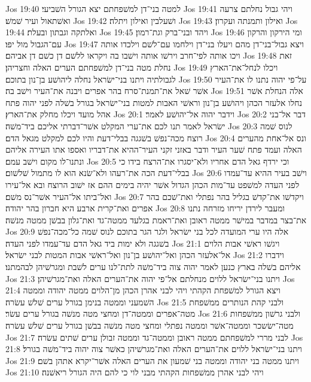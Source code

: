 Jos 19:40  למטה בני־דן למשׁפחתם יצא הגורל השׁביעי׃
Jos 19:41  ויהי גבול נחלתם צרעה ואשׁתאול ועיר שׁמשׁ׃
Jos 19:42  ושׁעלבין ואילון ויתלה׃
Jos 19:43  ואילון ותמנתה ועקרון׃
Jos 19:44  ואלתקה וגבתון ובעלת׃
Jos 19:45  ויהד ובני־ברק וגת־רמון׃
Jos 19:46  ומי הירקון והרקון עם־הגבול מול יפו׃
Jos 19:47  ויצא גבול־בני־דן מהם ויעלו בני־דן וילחמו עם־לשׁם וילכדו אותה ויכו אותה לפי־חרב וירשׁו אותה וישׁבו בה ויקראו ללשׁם דן כשׁם דן אביהם׃
Jos 19:48  זאת נחלת מטה בני־דן למשׁפחתם הערים האלה וחצריהן׃
Jos 19:49  ויכלו לנחל־את־הארץ לגבולתיה ויתנו בני־ישׂראל נחלה ליהושׁע בן־נון בתוכם׃
Jos 19:50  על־פי יהוה נתנו לו את־העיר אשׁר שׁאל את־תמנת־סרח בהר אפרים ויבנה את־העיר וישׁב בה׃
Jos 19:51  אלה הנחלת אשׁר נחלו אלעזר הכהן ויהושׁע בן־נון וראשׁי האבות למטות בני־ישׂראל בגורל בשׁלה לפני יהוה פתח אהל מועד ויכלו מחלק את־הארץ׃
Jos 20:1  וידבר יהוה אל־יהושׁע לאמר׃
Jos 20:2  דבר אל־בני ישׂראל לאמר תנו לכם את־ערי המקלט אשׁר־דברתי אליכם ביד־משׁה׃
Jos 20:3  לנוס שׁמה רוצח מכה־נפשׁ בשׁגגה בבלי־דעת והיו לכם למקלט מגאל הדם׃
Jos 20:4  ונס אל־אחת מהערים האלה ועמד פתח שׁער העיר ודבר באזני זקני העיר־ההיא את־דבריו ואספו אתו העירה אליהם ונתנו־לו מקום וישׁב עמם׃
Jos 20:5  וכי ירדף גאל הדם אחריו ולא־יסגרו את־הרצח בידו כי בבלי־דעת הכה את־רעהו ולא־שׂנא הוא לו מתמול שׁלשׁום׃
Jos 20:6  וישׁב בעיר ההיא עד־עמדו לפני העדה למשׁפט עד־מות הכהן הגדול אשׁר יהיה בימים ההם אז ישׁוב הרוצח ובא אל־עירו ואל־ביתו אל־העיר אשׁר־נס משׁם׃
Jos 20:7  ויקדשׁו את־קדשׁ בגליל בהר נפתלי ואת־שׁכם בהר אפרים ואת־קרית ארבע היא חברון בהר יהודה׃
Jos 20:8  ומעבר לירדן יריחו מזרחה נתנו את־בצר במדבר במישׁר ממטה ראובן ואת־ראמת בגלעד ממטה־גד ואת־גלון בבשׁן ממטה מנשׁה׃
Jos 20:9  אלה היו ערי המועדה לכל בני ישׂראל ולגר הגר בתוכם לנוס שׁמה כל־מכה־נפשׁ בשׁגגה ולא ימות ביד גאל הדם עד־עמדו לפני העדה׃
Jos 21:1  ויגשׁו ראשׁי אבות הלוים אל־אלעזר הכהן ואל־יהושׁע בן־נון ואל־ראשׁי אבות המטות לבני ישׂראל׃
Jos 21:2  וידברו אליהם בשׁלה בארץ כנען לאמר יהוה צוה ביד־משׁה לתת־לנו ערים לשׁבת ומגרשׁיהן לבהמתנו׃
Jos 21:3  ויתנו בני־ישׂראל ללוים מנחלתם אל־פי יהוה את־הערים האלה ואת־מגרשׁיהן׃
Jos 21:4  ויצא הגורל למשׁפחת הקהתי ויהי לבני אהרן הכהן מן־הלוים ממטה יהודה וממטה השׁמעני וממטה בנימן בגורל ערים שׁלשׁ עשׂרה׃
Jos 21:5  ולבני קהת הנותרים ממשׁפחת מטה־אפרים וממטה־דן ומחצי מטה מנשׁה בגורל ערים עשׂר׃
Jos 21:6  ולבני גרשׁון ממשׁפחות מטה־ישׂשכר וממטה־אשׁר וממטה נפתלי ומחצי מטה מנשׁה בבשׁן בגורל ערים שׁלשׁ עשׂרה׃
Jos 21:7  לבני מררי למשׁפחתם ממטה ראובן וממטה־גד וממטה זבולן ערים שׁתים עשׂרה׃
Jos 21:8  ויתנו בני־ישׂראל ללוים את־הערים האלה ואת־מגרשׁיהן כאשׁר צוה יהוה ביד־משׁה בגורל׃
Jos 21:9  ויתנו ממטה בני יהודה וממטה בני שׁמעון את הערים האלה אשׁר־יקרא אתהן בשׁם׃
Jos 21:10  ויהי לבני אהרן ממשׁפחות הקהתי מבני לוי כי להם היה הגורל ריאשׁנה׃
